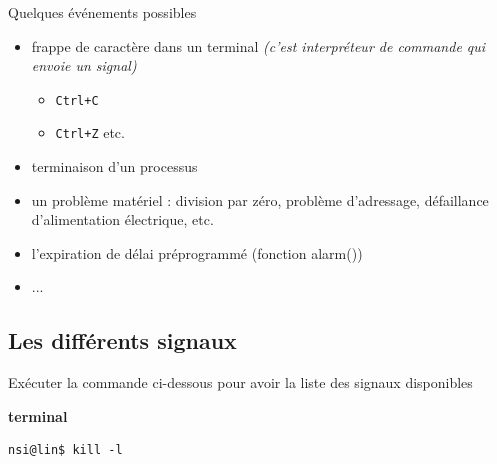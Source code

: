 \documentclass[10pt,french,A4]{article}
\theoremstyle{plain}
\newenvironment{code}[1]{%
    \begin{bclogo}[couleur=backcolour, couleurTexte=black ,couleurBord=blue ,couleurBarre=black, ombre=false,epBord=0.9,logo=\#,arrondi=0.1]{{\bfseries #1}}%
    }%
    {%
    \end{bclogo}
}%
\begin{document}
Quelques événements possibles
\begin{itemize}
    \item frappe de caractère dans un terminal \textit{(c'est interpréteur de commande qui envoie  un signal)}
    \begin{itemize}
        \item  \texttt{Ctrl+C} 
        \item \texttt{Ctrl+Z} etc.
    \end{itemize}
    \item terminaison d'un processus
    \item un problème matériel : division par zéro, problème d'adressage, défaillance d'alimentation électrique, etc.
    \item l'expiration de délai préprogrammé (fonction alarm())
    \item ...
\end{itemize}

\hypertarget{}{%
\subsection{Les différents signaux}\label{schuxe9ma-2}}
Exécuter la commande ci-dessous pour avoir la liste des signaux disponibles
\begin{code}{terminal}
    \begin{verbatim}
nsi@lin$ kill -l
    \end{verbatim}
\end{code}
\end{document}
